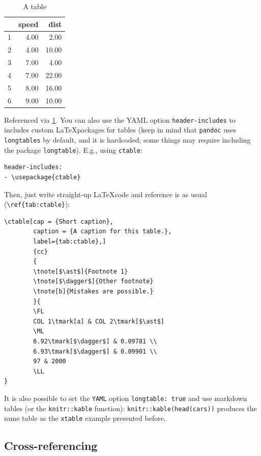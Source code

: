 \documentclass[Royal,times,sageh]{sagej}
\begin{document}
\begin{table}[ht]
\centering
\begin{tabular}{rrr}
  \hline
 & speed & dist \\ 
  \hline
1 & 4.00 & 2.00 \\ 
  2 & 4.00 & 10.00 \\ 
  3 & 7.00 & 4.00 \\ 
  4 & 7.00 & 22.00 \\ 
  5 & 8.00 & 16.00 \\ 
  6 & 9.00 & 10.00 \\ 
   \hline
\end{tabular}
\caption{A table} 
\label{tab:table}
\end{table}

Referenced via \ref{tab:table}. You can also use the YAML option
\texttt{header-includes} to includes custom \LaTeX packages for tables
(keep in mind that \texttt{pandoc} uses \texttt{longtables} by default,
and it is hardcoded; some things may require including the package
\texttt{longtable}). E.g., using \texttt{ctable}:

\begin{verbatim}
header-includes:
- \usepackage{ctable}
\end{verbatim}

Then, just write straight-up \LaTeX code and reference is as usual
(\texttt{\textbackslash{}ref\{tab:ctable\}}):

\begin{verbatim}
\ctable[cap = {Short caption},
        caption = {A caption for this table.},
        label={tab:ctable},]
        {cc}
        {
        \tnote[$\ast$]{Footnote 1}
        \tnote[$\dagger$]{Other footnote}
        \tnote[b]{Mistakes are possible.}
        }{
        \FL
        COL 1\tmark[a] & COL 2\tmark[$\ast$]
        \ML
        6.92\tmark[$\dagger$] & 0.09781 \\
        6.93\tmark[$\dagger$] & 0.09901 \\
        97 & 2000
        \LL
}
\end{verbatim}

It is also possible to set the \texttt{YAML} option
\texttt{longtable:\ true} and use markdown tables (or the
\texttt{knitr::kable} function): \texttt{knitr::kable(head(cars))}
produces the same table as the \texttt{xtable} example presented before.

\hypertarget{cross-referencing}{%
\subsection{Cross-referencing}\label{cross-referencing}}
\end{document}
